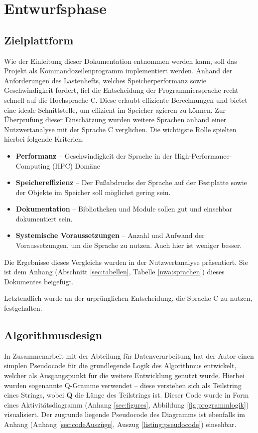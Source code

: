 \section{Entwurfsphase}
\label{section:entwurfsphase}
\subsection{Zielplattform}
Wie der Einleitung dieser Dokumentation entnommen werden kann, soll das Projekt als Kommandozeilenprogramm
implementiert werden. Anhand der Anforderungen des Lastenhefts, welches Speicherperformanz sowie Geschwindigkeit fordert,
fiel die Entscheidung der Programmiersprache recht schnell auf die Hochsprache C. Diese erlaubt effiziente Berechnungen und bietet eine ideale Schnittstelle, um effizient im Speicher agieren zu können.
Zur Überprüfung dieser Einschätzung wurden weitere Sprachen anhand einer
Nutzwertanalyse mit der Sprache C verglichen. Die wichtigste Rolle spielten hierbei folgende Kriterien:
\begin{itemize}
    \item \textbf{Performanz} -- Geschwindigkeit der Sprache in der High-Performance-Computing (HPC) Domäne
    \item \textbf{Speichereffizienz} -- Der Fußabdrucks der Sprache auf der Festplatte sowie der Objekte im Speicher soll möglichst gering sein.
    \item \textbf{Dokumentation} -- Bibliotheken und Module sollen gut und einsehbar dokumentiert sein.
    \item \textbf{Systemische Voraussetzungen} -- Anzahl und Aufwand der Voraussetzungen, um die Sprache zu nutzen. Auch hier ist weniger besser.
\end{itemize}

Die Ergebnisse dieses Vergleichs wurden in der Nutzwertanalyse präsentiert.
Sie ist dem Anhang (Abschnitt \ref{sec:tabellen}, Tabelle \ref{nwa:sprachen})  dieses Dokumentes beigefügt.\par
Letztendlich wurde an der urprünglichen Entscheidung, die Sprache C zu nutzen, festgehalten.

\subsection{Algorithmusdesign}
In Zusammenarbeit mit der Abteilung für Datenverarbeitung hat der Autor einen simplen
Pseudocode für die grundlegende Logik des Algorithmus entwickelt, welcher als Ausgangspunkt
für die weitere Entwicklung genutzt wurde. Hierbei wurden sogenannte Q-Gramme verwendet --
diese verstehen sich als Teilstring eines Strings, wobei \textbf{Q} die Länge des Teilstrings ist. Dieser Code wurde in Form eines
Aktivitätsdiagramm (Anhang \ref{sec:figures}, Abbildung \ref{fig:programmlogik})
visualisiert. Der zugrunde liegende  Pseudocode des Diagramms ist ebenfalls im Anhang
(Anhang \ref{sec:codeAuszüge}, Auszug \ref{listing:pseudocode}) einsehbar.


